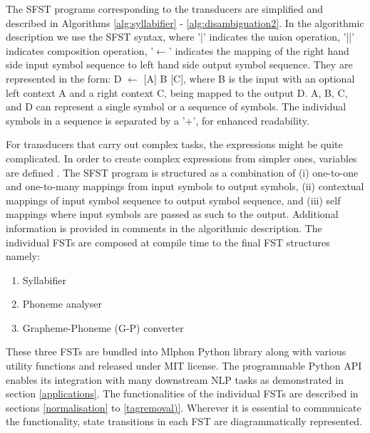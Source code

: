 The SFST programs corresponding to the transducers are simplified and described
in Algorithms \ref{alg:syllabifier} - \ref{alg:disambiguation2}. In the algorithmic
description we use the SFST syntax, where {\ipa '|'} indicates the union
operation, {\ipa '||'} indicates composition operation, '$\leftarrow$'
indicates the mapping of the right hand side input symbol sequence to left hand
side output symbol sequence. They are represented in the form: D $\leftarrow$
[A] B [C], where B is the input with an optional left context A and a right
context C, being mapped to the output D. A, B, C, and D can represent a single
symbol or a sequence of symbols. The individual symbols in a sequence is
separated by a {\ipa '+'}, for enhanced readability.

For transducers that carry out complex tasks, the expressions might be quite
complicated. In order to create complex expressions from simpler ones,
variables are defined \cite{schmid2005sfst}. The SFST program is structured as
a combination of (i) one-to-one and one-to-many mappings from input symbols to
output symbols, (ii) contextual mappings of input symbol sequence to output
symbol sequence, and (iii) self mappings where input symbols are passed as such
to the output. Additional information is provided in comments in the
algorithmic description.
The individual FSTs are composed at compile time to the final FST structures
namely:

\begin{enumerate}
	\item Syllabifier
	\item Phoneme analyser
	\item Grapheme-Phoneme (G-P) converter
\end{enumerate}

These three FSTs are bundled into Mlphon Python library along with various
utility functions and released under MIT license. The programmable Python API
enables its integration with many downstream NLP tasks as demonstrated in
section \ref{applications}. The functionalities of the individual FSTs are
described in sections \ref{normalisation} to \ref{tagremoval)}. Wherever it is
essential to communicate the functionality, state transitions in each FST are
diagrammatically represented.


